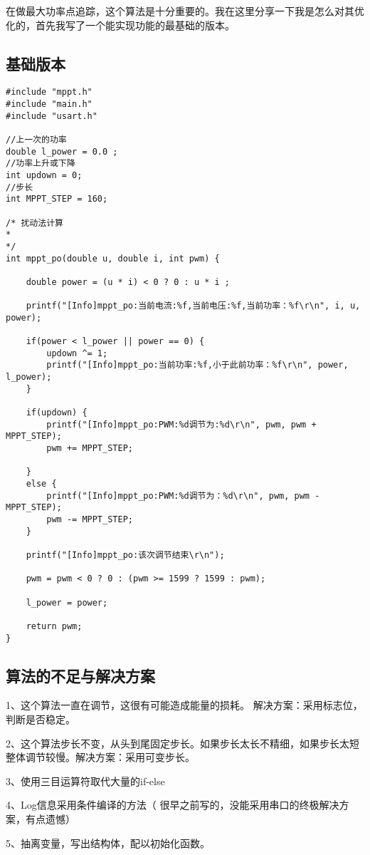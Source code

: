 \documentclass[cn,11pt]{elegantbook}
\begin{document}
在做最大功率点追踪，这个算法是十分重要的。我在这里分享一下我是怎么对其优化的，首先我写了一个能实现功能的最基础的版本。

\subsection{基础版本}

\lstset{language=C}
\begin{lstlisting}
#include "mppt.h"
#include "main.h"
#include "usart.h"

//上一次的功率
double l_power = 0.0 ;
//功率上升或下降
int updown = 0;
//步长
int MPPT_STEP = 160;

/* 扰动法计算
*
*/
int mppt_po(double u, double i, int pwm) {

	double power = (u * i) < 0 ? 0 : u * i ;
	
	printf("[Info]mppt_po:当前电流:%f,当前电压:%f,当前功率：%f\r\n", i, u, power);
	
	if(power < l_power || power == 0) {
		updown ^= 1;
		printf("[Info]mppt_po:当前功率:%f,小于此前功率：%f\r\n", power, l_power);
	}
	
	if(updown) {
		printf("[Info]mppt_po:PWM:%d调节为:%d\r\n", pwm, pwm + MPPT_STEP);
		pwm += MPPT_STEP;
	
	}
	else {
		printf("[Info]mppt_po:PWM:%d调节为：%d\r\n", pwm, pwm - MPPT_STEP);
		pwm -= MPPT_STEP;
	}
	
	printf("[Info]mppt_po:该次调节结束\r\n");
	
	pwm = pwm < 0 ? 0 : (pwm >= 1599 ? 1599 : pwm);
	
	l_power = power;
	
	return pwm;
}

\end{lstlisting}

\subsection{算法的不足与解决方案}

1、这个算法一直在调节，这很有可能造成能量的损耗。 解决方案：采用标志位，判断是否稳定。

2、这个算法步长不变，从头到尾固定步长。如果步长太长不精细，如果步长太短整体调节较慢。解决方案：采用可变步长。

3、使用三目运算符取代大量的if-else

4、Log信息采用条件编译的方法（  很早之前写的，没能采用串口的终极解决方案，有点遗憾） 

5、抽离变量，写出结构体，配以初始化函数。
\end{document}
